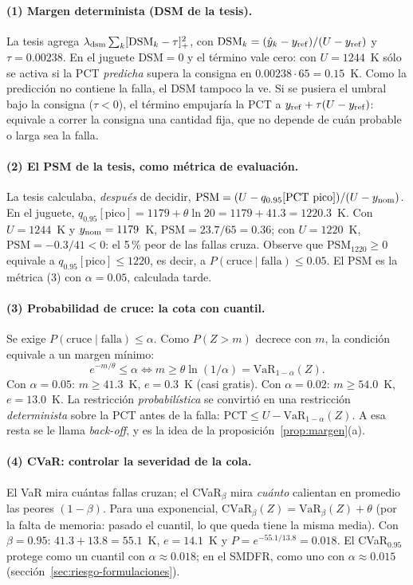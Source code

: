 \paragraph{(1) Margen determinista (DSM de la tesis).} La tesis agrega
$\lambda_{\rm dsm}\sum_k[\mathrm{DSM}_k-\tau]_+^2$, con
$\mathrm{DSM}_k=(\hat y_k-y_{\rm ref})/(U-y_{\rm ref})$ y $\tau=0.00238$. En el juguete
$\mathrm{DSM}=0$ y el término vale cero: con $U=1244$~K sólo se activa si la PCT \emph{predicha}
supera la consigna en $0.00238\cdot65=0.15$~K. Como la predicción no contiene la falla, el DSM
tampoco la ve. Si se pusiera el umbral bajo la consigna ($\tau<0$), el término empujaría la PCT a
$y_{\rm ref}+\tau(U-y_{\rm ref})$: equivale a correr la consigna una cantidad fija, que no depende de
cuán probable o larga sea la falla.

\paragraph{(2) El PSM de la tesis, como métrica de evaluación.} La tesis calculaba, \emph{después}
de decidir, $\mathrm{PSM}=(U-q_{0.95}[\text{PCT pico}])/(U-y_{\rm nom})$. En el juguete,
$q_{0.95}[\text{pico}]=1179+\theta\ln20=1179+41.3=1220.3$~K. Con $U=1244$~K y $y_{\rm nom}=1179$~K,
$\mathrm{PSM}=23.7/65=0.36$; con $U=1220$~K, $\mathrm{PSM}=-0.3/41<0$: el 5\,\% peor de las fallas
cruza. Observe que $\mathrm{PSM}_{1220}\ge0$ equivale a $q_{0.95}[\text{pico}]\le1220$, es decir, a
$P(\text{cruce}\mid\text{falla})\le0.05$. El PSM es la métrica (3) con $\alpha=0.05$, calculada
tarde.

\paragraph{(3) Probabilidad de cruce: la cota con cuantil.} Se exige
$P(\text{cruce}\mid\text{falla})\le\alpha$. Como $P(Z>m)$ decrece con $m$, la condición equivale a
un margen mínimo:
\[
e^{-m/\theta}\le\alpha\iff m\ge\theta\ln(1/\alpha)=\mathrm{VaR}_{1-\alpha}(Z).
\]
Con $\alpha=0.05$: $m\ge41.3$~K, $e=0.3$~K (casi gratis). Con $\alpha=0.02$: $m\ge54.0$~K, $e=13.0$~K.
La restricción \emph{probabilística} se convirtió en una restricción \emph{determinista} sobre la
PCT antes de la falla: $\mathrm{PCT}\le U-\mathrm{VaR}_{1-\alpha}(Z)$. A esa resta se le llama
\emph{back-off}, y es la idea de la proposición~\ref{prop:margen}(a).

\paragraph{(4) CVaR: controlar la severidad de la cola.} El VaR mira cuántas fallas cruzan; el
CVaR$_\beta$ mira \emph{cuánto} calientan en promedio las peores $(1-\beta)$. Para una exponencial,
$\mathrm{CVaR}_\beta(Z)=\mathrm{VaR}_\beta(Z)+\theta$ (por la falta de memoria: pasado el cuantil, lo
que queda tiene la misma media). Con $\beta=0.95$: $41.3+13.8=55.1$~K, $e=14.1$~K y
$P=e^{-55.1/13.8}=0.018$. El CVaR$_{0.95}$ protege como un cuantil con $\alpha\approx0.018$; en el
SMDFR, como uno con $\alpha\approx0.015$ (sección~\ref{sec:riesgo-formulaciones}).

